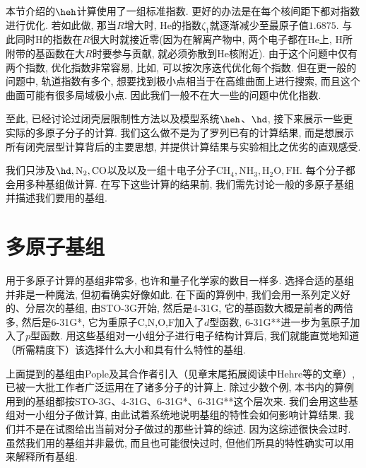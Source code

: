 
本节介绍的$\heh$计算使用了一组标准指数. 
更好的办法是在每个核间距下都对指数进行优化. 
若如此做, 
那当$R$增大时, 
$\text{He}$的指数$\zeta_1$就逐渐减少至最原子值$1.6875$. 
与此同时$\text{H}$的指数在$R$很大时就接近零(因为在解离产物中, 
两个电子都在$\text{He}$上, 
$\text{H}$所附带的基函数在大$R$时要参与贡献, 
就必须弥散到$\text{He}$核附近). 
由于这个问题中仅有两个指数, 
优化指数非常容易, 
比如, 
可以按次序迭代优化每个指数. 
但在更一般的问题中, 
轨道指数有多个, 
想要找到极小点相当于在高维曲面上进行搜索, 
而且这个曲面可能有很多局域极小点. 
因此我们一般不在大一些的问题中优化指数. 


至此, 
已经讨论过闭壳层限制性\hft 方法以及模型系统$\heh$、$\hd$, 
接下来展示一些更实际的多原子分子的计算. 
我们这么做不是为了罗列已有的计算结果, 
而是想展示所有闭壳层\hft 型计算背后的主要思想, 
并提供计算结果与实验相比之优劣的直观感受. 


我们只涉及$\hd, \text{N}_2, \text{CO}$以及以及一组十电子分子$\text{CH}_4, \text{NH}_3, \text{H}_2\text{O}, \text{FH}$.
每个分子都会用多种基组做计算. 
在写下这些计算的结果前, 
我们需先讨论一般的多原子基组并描述我们要用的基组. 


\section{多原子基组}
\label{sec:3.6}
用于多原子计算的基组非常多, 
也许和量子化学家的数目一样多. 
选择合适的基组并非是一种魔法, 
但初看确实好像如此. 
在下面的算例中, 
我们会用一系列定义好的、分层次的基组, 
由STO-3G开始, 
然后是4-31G, 
它的基函数大概是前者的两倍多, 
然后是6-31G*, 
它为重原子C,N,O,F加入了$d$型函数, 
6-31G**进一步为氢原子加入了$p$型函数. 
用这些基组对一小组分子进行电子结构计算后, 
我们就能直觉地知道（所需精度下）该选择什么大小和具有什么特性的基组. 


上面提到的基组由Pople及其合作者引入（见章末尾拓展阅读中Hehre等的文章）, 
已被一大批工作者广泛运用在了诸多分子的计算上. 
除过少数个例, 
本书内的算例用到的基组都按STO-3G、4-31G、6-31G*、6-31G**这个层次来. 
我们会用这些基组对一小组分子做计算, 
由此试着系统地说明基组的特性会如何影响计算结果. 
我们并不是在试图给出当前对分子做过的那些计算的综述. 
因为这综述很快会过时. 
虽然我们用的基组并非最优, 
而且也可能很快过时, 
但他们所具的特性确实可以用来解释所有基组. 


